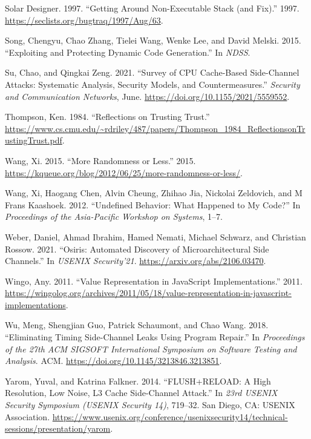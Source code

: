 \documentclass[
  a4paper,
]{report}
\newlength{\cslhangindent}
\newlength{\cslentryspacingunit} %
\newenvironment{CSLReferences}[2] %
 {%
  \setlength{\parindent}{0pt}
  \ifodd #1
  \let\oldpar\par
  \def\par{\hangindent=\cslhangindent\oldpar}
  \fi
  \setlength{\parskip}{#2\cslentryspacingunit}
 }%
 {}
\begin{document}
\begin{CSLReferences}{1}{0}
\leavevmode{}%
Solar Designer. 1997. {``Getting Around Non-Executable Stack (and
Fix).''} 1997. \url{https://seclists.org/bugtraq/1997/Aug/63}.

\leavevmode{}%
Song, Chengyu, Chao Zhang, Tielei Wang, Wenke Lee, and David Melski.
2015. {``Exploiting and Protecting Dynamic Code Generation.''} In
\emph{NDSS}.

\leavevmode{}%
Su, Chao, and Qingkai Zeng. 2021. {``Survey of {CPU} Cache-Based
Side-Channel Attacks: Systematic Analysis, Security Models, and
Countermeasures.''} \emph{Security and Communication Networks}, June.
\url{https://doi.org/10.1155/2021/5559552}.

\leavevmode{}%
Thompson, Ken. 1984. {``Reflections on Trusting Trust.''}
\url{https://www.cs.cmu.edu/~rdriley/487/papers/Thompson_1984_ReflectionsonTrustingTrust.pdf}.

\leavevmode{}%
Wang, Xi. 2015. {``More Randomness or Less.''} 2015.
\url{https://kqueue.org/blog/2012/06/25/more-randomness-or-less/}.

\leavevmode{}%
Wang, Xi, Haogang Chen, Alvin Cheung, Zhihao Jia, Nickolai Zeldovich,
and M Frans Kaashoek. 2012. {``Undefined Behavior: What Happened to My
Code?''} In \emph{Proceedings of the Asia-Pacific Workshop on Systems},
1--7.

\leavevmode{}%
Weber, Daniel, Ahmad Ibrahim, Hamed Nemati, Michael Schwarz, and
Christian Rossow. 2021. {``Osiris: Automated Discovery of
Microarchitectural Side Channels.''} In \emph{USENIX Security'21}.
\url{https://arxiv.org/abs/2106.03470}.

\leavevmode{}%
Wingo, Any. 2011. {``Value Representation in JavaScript
Implementations.''} 2011.
\url{https://wingolog.org/archives/2011/05/18/value-representation-in-javascript-implementations}.

\leavevmode{}%
Wu, Meng, Shengjian Guo, Patrick Schaumont, and Chao Wang. 2018.
{``Eliminating Timing Side-Channel Leaks Using Program Repair.''} In
\emph{Proceedings of the 27th {ACM} {SIGSOFT} International Symposium on
Software Testing and Analysis}. {ACM}.
\url{https://doi.org/10.1145/3213846.3213851}.

\leavevmode{}%
Yarom, Yuval, and Katrina Falkner. 2014. {``{FLUSH+RELOAD}: A High
Resolution, Low Noise, L3 Cache {Side-Channel} Attack.''} In \emph{23rd
USENIX Security Symposium (USENIX Security 14)}, 719--32. San Diego, CA:
USENIX Association.
\url{https://www.usenix.org/conference/usenixsecurity14/technical-sessions/presentation/yarom}.

\end{CSLReferences}
\end{document}

